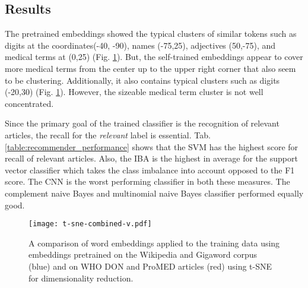 \subsection{Results}
  The pretrained embeddings showed the typical clusters of similar tokens such as digits at the coordinates(-40, -90), names (-75,25), adjectives (50,-75), and medical terms at (0,25) (Fig. \ref{fig:t-sne}).
  But, the self-trained embeddings appear to cover more medical terms from the center up to the upper right corner that also seem to be clustering.
  Additionally, it also contains typical clusters such as digits (-20,30) (Fig. \ref{fig:t-sne}).
  However, the sizeable medical term cluster is not well concentrated.

  Since the primary goal of the trained classifier is the recognition of relevant articles, the recall for the \textsl{relevant} label is essential.
  Tab. \ref{table:recommender_performance} shows that the SVM has the highest score for recall of relevant articles.
  Also, the IBA is the highest in average for the support vector classifier which takes the class imbalance into account opposed to the F1 score.
  The CNN is the worst performing classifier in both these measures.
  The complement naive Bayes and multinomial naive Bayes classifier performed equally good.

  \begin{figure}
    \centering
    \texttt{[image: t-sne-combined-v.pdf]}
    \caption{A comparison of word embeddings applied to the training data using embeddings pretrained on the Wikipedia and Gigaword corpus (blue) and on WHO DON and ProMED articles (red) using t-SNE for dimensionality reduction.}
  \label{fig:t-sne}
  \end{figure}

